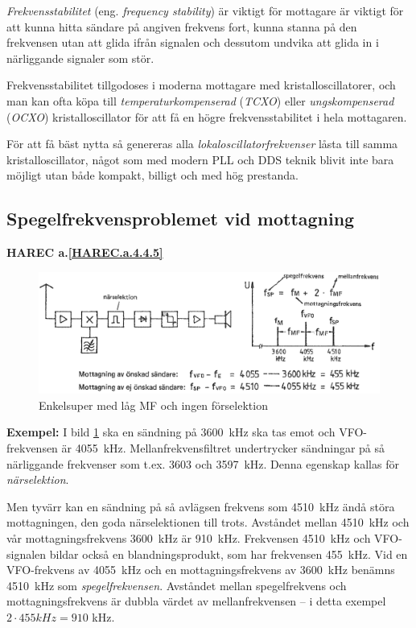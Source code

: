 \emph{Frekvensstabilitet} (eng. \emph{frequency stability}) är viktigt för
mottagare är viktigt för att kunna hitta sändare på angiven frekvens fort,
kunna stanna på den frekvensen utan att glida ifrån signalen och dessutom
undvika att glida in i närliggande signaler som stör.

Frekvensstabilitet tillgodoses i moderna mottagare med kristalloscillatorer,
och man kan ofta köpa till \emph{temperaturkompenserad} (\emph{TCXO}) eller
\emph{ungskompenserad} (\emph{OCXO}) kristalloscillator för att få en högre
frekvensstabilitet i hela mottagaren.

För att få bäst nytta så genereras alla \emph{lokaloscillatorfrekvenser} låsta
till samma kristalloscillator, något som med modern PLL och DDS teknik blivit
inte bara möjligt utan både kompakt, billigt och med hög prestanda.

\subsection{Spegelfrekvensproblemet vid mottagning}
\textbf{HAREC a.\ref{HAREC.a.4.4.5}\label{myHAREC.a.4.4.5}}

\begin{figure}
  \includegraphics[width=\textwidth]{images/cropped_pdfs/bild_2_4-22.pdf}
  \caption{Enkelsuper med låg MF och ingen förselektion}
  \label{fig:bildII4-22}
\end{figure}

\textbf{Exempel:}
I bild \ref{fig:bildII4-22} ska en sändning på 3600~kHz ska tas emot och
VFO-frekvensen är 4055~kHz.
Mellanfrekvensfiltret undertrycker sändningar på så närliggande frekvenser
som t.ex. 3603 och 3597~kHz.
Denna egenskap kallas för \emph{närselektion}.

Men tyvärr kan en sändning på så avlägsen frekvens som 4510~kHz ändå
störa mottagningen, den goda närselektionen till trots.
Avståndet mellan 4510~kHz och vår mottagningsfrekvens 3600~kHz är 910~kHz.
Frekvensen 4510~kHz och VFO-signalen bildar också en blandningsprodukt,
som har frekvensen 455~kHz.
Vid en VFO-frekvens av 4055~kHz och en mottagningsfrekvens av 3600~kHz benämns
4510~kHz som \emph{spegelfrekvensen}.
Avståndet mellan spegelfrekvens och mottagningsfrekvens är dubbla värdet av
mellanfrekvensen -- i detta exempel \(2 \cdot 455kHz = 910\) kHz.


